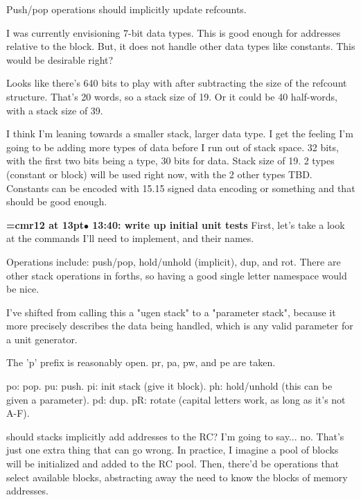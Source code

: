 Push/pop operations should implicitly update refcounts.
\par

I was currently envisioning 7-bit data types. This is good enough for addresses relative to the block. But, it does not handle other data types like constants. This would be desirable right?
\par

Looks like there's 640 bits to play with after subtracting the size of the refcount structure. That's 20 words, so a stack size of 19. Or it could be 40 half-words, with a stack size of 39.
\par

I think I'm leaning towards a smaller stack, larger data type. I get the feeling I'm going to be adding more types of data before I run out of stack space. 32 bits, with the first two bits being a type, 30 bits for data. Stack size of 19. 2 types (constant or block) will be used right now, with the 2 other types TBD. Constants can be encoded with 15.15 signed data encoding or something and that should be good enough.
\par

{\smallskip\noindent\bf\font\titlefont=cmr12 at 13pt\titlefont $\bullet$ 13:40: write up initial unit tests}\smallskip
First, let's take a look at the commands I'll need to implement, and their names.
\par

Operations include: push/pop, hold/unhold (implicit), dup, and rot. There are other stack operations in forths, so having a good single letter namespace would be nice.
\par

I've shifted from calling this a "ugen stack" to a "parameter stack", because it more precisely describes the data being handled, which is any valid parameter for a unit generator.
\par

The 'p' prefix is reasonably open. pr, pa, pw, and pe are taken.
\par

po: pop. pu: push. pi: init stack (give it block). ph: hold/unhold (this can be given a parameter). pd: dup. pR: rotate (capital letters work, as long as it's not A-F).
\par

should stacks implicitly add addresses to the RC? I'm going to say... no. That's just one extra thing that can go wrong. In practice, I imagine a pool of blocks will be initialized and added to the RC pool. Then, there'd be operations that select available blocks, abstracting away the need to know the blocks of memory addresses.
\par

